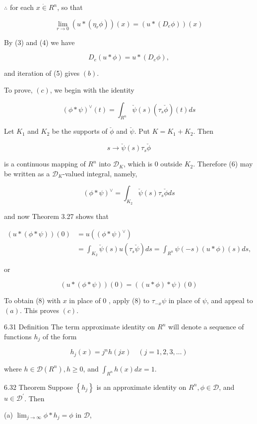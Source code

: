 \documentclass[10pt]{article}
\begin{document}
$\therefore$ for each $x \dot{\in} R^{n}$, so that

$$
\lim _{r \rightarrow 0}\left(u *\left(\eta_{r} \phi\right)\right)(x)=\left(u *\left(D_{e} \phi\right)\right)(x)
$$

By (3) and (4) we have

$$
D_{e}(u * \phi)=u *\left(D_{e} \phi\right),
$$

and iteration of (5) gives $(b)$.

To prove, $(c)$, we begin with the identity

$$
(\phi * \psi)^{\vee}(t)=\int_{R^{n}} \check{\psi}(s)\left(\tau_{s} \check{\phi}\right)(t) d s
$$

Let $K_{1}$ and $K_{2}$ be the supports of $\check{\phi}$ and $\check{\psi}$. Put $K=K_{1}+K_{2}$. Then

$$
s \rightarrow \check{\psi}(s) \tau_{s} \check{\phi}
$$

is a continuous mapping of $R^{n}$ into $\mathscr{D}_{K}$, which is 0 outside $K_{2}$. Therefore (6) may be written as a $\mathscr{D}_{K}$-valued integral, namely,

$$
(\phi * \psi)^{\vee}=\int_{K_{2}} \check{\psi}(s) \tau_{s} \check{\phi} d s
$$

and now Theorem 3.27 shows that

$$
\begin{aligned}
(u *(\phi * \psi))(0) & =u\left((\phi * \psi)^{\vee}\right) \\
& =\int_{K_{2}} \check{\psi}(s) u\left(\tau_{s} \check{\psi}\right) d s=\int_{R^{n}} \psi(-s)(u * \phi)(s) d s,
\end{aligned}
$$

or

$$
(u *(\phi * \psi))(0)=((u * \phi) * \psi)(0)
$$

To obtain (8) with $x$ in place of 0 , apply (8) to $\tau_{-x} \psi$ in place of $\psi$, and appeal to $(a)$. This proves $(c)$.

6.31 Definition The term approximate identity on $R^{n}$ will denote a sequence of functions $h_{j}$ of the form

$$
h_{j}(x)=j^{n} h(j x) \quad(j=1,2,3, \ldots)
$$

where $h \in \mathscr{D}\left(R^{n}\right), h \geq 0$, and $\int_{R^{n}} h(x) d x=1$.

6.32 Theorem Suppose $\left\{h_{j}\right\}$ is an approximate identity on $R^{n}, \phi \in \mathscr{D}$, and $u \in \mathscr{D}^{\prime}$. Then

(a) $\lim _{j \rightarrow \infty} \phi * h_{j}=\phi$ in $\mathscr{D}$,
\end{document}
